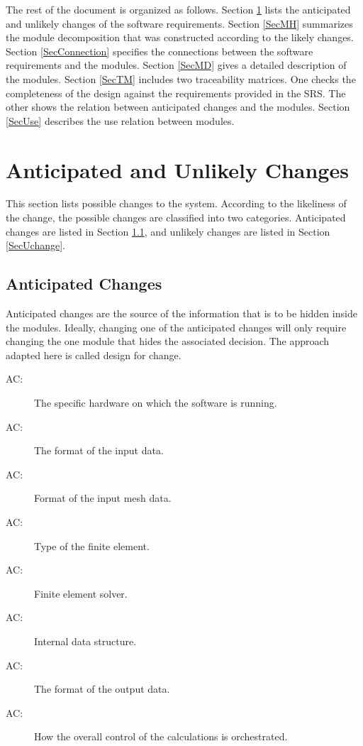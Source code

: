 \documentclass[12pt, titlepage]{article}
\newcounter{acnum}
\newcommand{\actheacnum}{AC\theacnum}
\begin{document}
The rest of the document is organized as follows. Section
\ref{SecChange} lists the anticipated and unlikely changes of the software
requirements. Section \ref{SecMH} summarizes the module decomposition that
was constructed according to the likely changes. Section \ref{SecConnection}
specifies the connections between the software requirements and the
modules. Section \ref{SecMD} gives a detailed description of the
modules. Section \ref{SecTM} includes two traceability matrices. One checks
the completeness of the design against the requirements provided in the SRS. The
other shows the relation between anticipated changes and the modules. Section
\ref{SecUse} describes the use relation between modules.

\section{Anticipated and Unlikely Changes} \label{SecChange}

This section lists possible changes to the system. According to the likeliness
of the change, the possible changes are classified into two
categories. Anticipated changes are listed in Section \ref{SecAchange}, and
unlikely changes are listed in Section \ref{SecUchange}.

\subsection{Anticipated Changes} \label{SecAchange}

Anticipated changes are the source of the information that is to be hidden
inside the modules. Ideally, changing one of the anticipated changes will only
require changing the one module that hides the associated decision. The approach
adapted here is called design for
change.

\begin{description}
\item[ \actheacnum \label{acHardware}:] The specific
  hardware on which the software is running.
\item[ \actheacnum \label{acInput}:] The format of the input data.
\item[ \actheacnum \label{acMeshIn}:] Format of the input mesh data.
\item[ \actheacnum \label{acFiniteElement}:] Type of the finite element.
\item[ \actheacnum \label{acFEM}:] Finite element solver. 
\item[ \actheacnum \label{acData}:] Internal data structure.
\item[ \actheacnum \label{acOut}:] The format of the output data.
\item[ \actheacnum \label{acSControl}:] How the overall control of the calculations is orchestrated.


\end{description}
\end{document}
